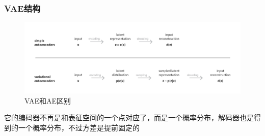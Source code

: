 \documentclass[]{report}
\begin{document}
\subsubsection{VAE结构}
\begin{figure}[h]
	\centering
	\includegraphics[width=0.8\linewidth]{images/screenshot012}
	\caption{VAE和AE区别}
	\label{fig:screenshot012}
\end{figure}
\FloatBarrier
它的编码器不再是和表征空间的一个点对应了，而是一个概率分布，解码器也是得到的一个概率分布，不过方差是提前固定的
\end{document}
